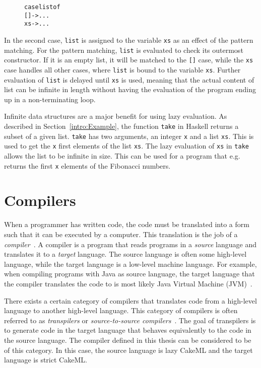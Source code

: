 \begin{figure}[H]
\begin{alltt}
  case list of
    [] -> ...
    xs -> ...
\end{alltt}
\end{figure}

\noindent In the second case, \texttt{list} is assigned to the variable
\texttt{xs} as an effect of the pattern matching. For the pattern matching,
\texttt{list} is evaluated to check its outermost constructor. If it is an empty
list, it will be matched to the \texttt{[]} case, while the \texttt{xs} case
handles all other cases, where \texttt{list} is bound to the variable
\texttt{xs}. Further evaluation of
\texttt{list} is delayed until \texttt{xs} is used, meaning
that the actual content of list can be infinite in length without having the
evaluation of the program ending up in a non-terminating loop.

Infinite data structures are a major benefit for using lazy evaluation.
As described in Section~\ref{intro:Example}, the function \texttt{take}
in Haskell returns a subset of a given list. \texttt{take} has two arguments,
an integer \texttt{x} and a list \texttt{xs}. This is used to get the
\texttt{x} first elements of the list \texttt{xs}. The lazy evaluation of
\texttt{xs} in \texttt{take} allows the list to be infinite in size. This
can be used for a program that e.g. returns the first \texttt{x} elements of
the Fibonacci numbers.


\section{Compilers}
When a programmer has written code, the code must be translated into a form such
that it can be executed by a computer. This translation is the job of a
\textit{compiler}~\cite{DragonBook}. A compiler is a program that reads
programs in a \textit{source} language and translates it to a \textit{target}
language. The source language is often some high-level language, while the
target language is a low-level machine language.
For example, when compiling programs with Java as source language, the target
language that the compiler translates the code to is most likely Java Virtual
Machine (JVM)~\cite{JavaJVM}.

There exists a certain category of compilers that translates code from a
high-level language to another high-level language. This category of compilers
is often referred to as \textit{transpilers} or
\textit{source-to-source compilers}~\cite{kulkarnitranspiler}.
The goal of transpilers is to generate code in the target language that behaves
equivalently to the code in the source language. The compiler defined in this %
thesis can be considered to be of this category. In this case, the source
language is lazy CakeML and the target language is strict CakeML.

